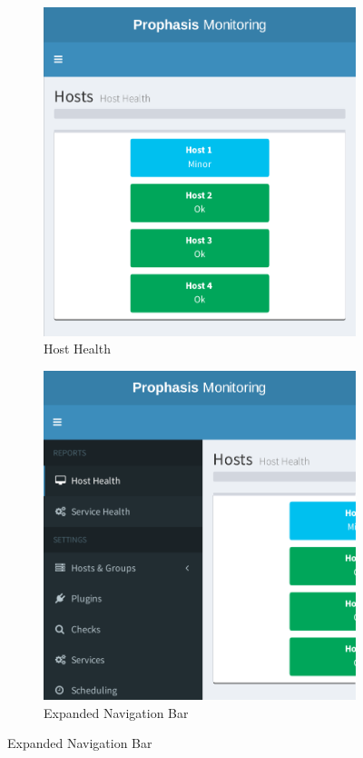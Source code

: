 \documentclass[bsc,deptreport,twoside,parskip,singlespacing,notimes]{infthesis}
\begin{document}
\begin{figure}
    \centering
    \begin{subfigure}[b]{0.45\textwidth}
        \includegraphics[width=\textwidth]{assets/screenshots/responsive-host-health.pdf}
        \caption{Host Health}
        \label{responsive-host-health}
    \end{subfigure}
    \begin{subfigure}[b]{0.45\textwidth}
        \includegraphics[width=\textwidth]{assets/screenshots/responsive-nav-bar-expanded.pdf}
        \caption{Expanded Navigation Bar}
        \label{responsive-nav-bar-expanded}
    \end{subfigure}


\end{figure}
\end{document}
